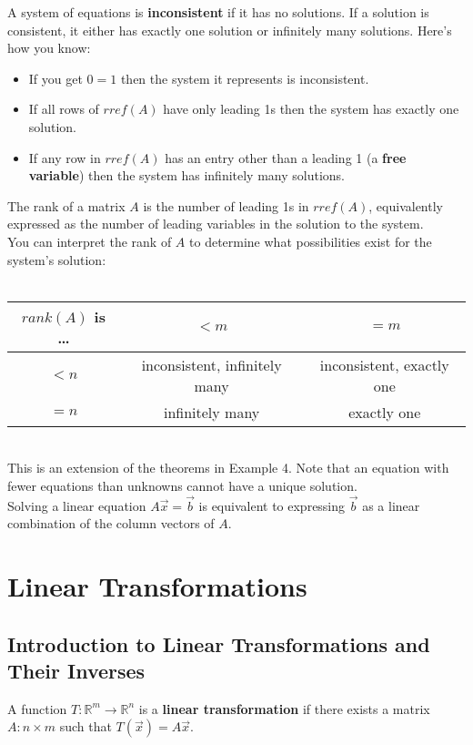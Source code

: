 \documentclass[]{scrartcl}
\begin{document}
	A system of equations is \textbf{inconsistent} if it has no solutions. If a solution is consistent, it either has exactly one solution or infinitely many solutions. Here's how you know:
	
	\begin{itemize}
		\item If you get $0 = 1$ then the system it represents is inconsistent.
		\item If all rows of $rref(A)$ have only leading 1s then the system has exactly one solution.
		\item If any row in $rref(A)$ has an entry other than a leading 1 (a \textbf{free variable}) then the system has infinitely many solutions.
	\end{itemize}
	
	The rank of a matrix $A$ is the number of leading 1s in $rref(A)$, equivalently expressed as the number of leading variables in the solution to the system.\\
	
	You can interpret the rank of $A$ to determine what possibilities exist for the system's solution:\\\\
	\begin{tabular}{ |c|c|c| } 
		\hline
		$rank(A)$ is \ldots & $< m$ & $ = m$ \\ 
		\hline
		$< n$ & inconsistent, infinitely many & inconsistent, exactly one \\ 
		\hline
		$= n$ & infinitely many & exactly one \\ 
		\hline
	\end{tabular}\\

	This is an extension of the theorems in Example 4. Note that an equation with fewer equations than unknowns cannot have a unique solution.\\
	
	Solving a linear equation $A\vec{x}=\vec{b}$ is equivalent to expressing $\vec{b}$ as a linear combination of the column vectors of $A$.
	
	\setcounter{section}{1}
	\section{Linear Transformations}
	\subsection{Introduction to Linear Transformations and Their Inverses}
	A function $T: \mathbb{R}^m \rightarrow \mathbb{R}^n$ is a \textbf{linear transformation} if there exists a matrix  $A: n \times m$ such that $T(\vec{x}) = A\vec{x}$.\\
	
\end{document}
